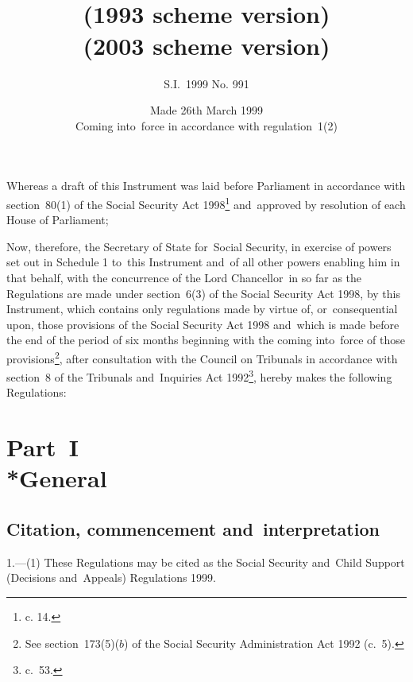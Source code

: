 \documentclass[12pt,a4paper]{article}
\title{\regstitle\\(1993 scheme version)}
\title{\regstitle\\(2003 scheme version)}
\author{S.I.~1999 No. 991}
\date{Made 26th March 1999\\Coming into~force in accordance with regulation~1(2)}
\begin{document}
\maketitle

\noindent
Whereas a draft of this Instrument was laid before Parliament in accordance with section~80(1) of the Social Security Act 1998\footnote{ c. 14.} and~approved by resolution of each House of Parliament;

 Now, therefore, the Secretary of State for~Social Security, in exercise of powers set out in Schedule 1 to~this Instrument and~of all other powers enabling him in that behalf, with the concurrence of the Lord Chancellor~in so far as the Regulations are made under section~6(3) of the Social Security Act 1998, by this Instrument, which contains only regulations made by virtue of, or~consequential upon, those provisions of the Social Security Act 1998 and~which is made before the end of the period of six months beginning with the coming into~force of those provisions\footnote{\frenchspacing See section~173(5)($b$) of the Social Security Administration Act 1992 (c.~5).}, after consultation with the Council on Tribunals in accordance with section~8 of the Tribunals and~Inquiries Act 1992\footnote{ c.~53.}, hereby makes the following Regulations:

{\sloppy

\tableofcontents

}

\bigskip

\setcounter{secnumdepth}{-2}

\section[Part~I --- General]{Part~I\\*General}

\renewcommand\parthead{--- Part~I}

\subsection[1. Citation, commencement and~interpretation]{Citation, commencement and~interpretation}

1.—(1) These Regulations may be cited as the Social Security and~Child Support (Decisions and~Appeals) Regulations 1999.
\end{document}
